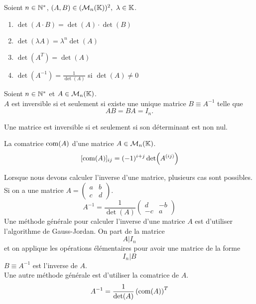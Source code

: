 \begin{proposition}
	Soient $n \in \mathbb{N}^*$, $(A, B) \in (\mathcal{M}_n(\mathbb{K}))^2,\ \lambda \in \mathbb{K}$.
	\begin{multicols}{2}
	    \begin{enumerate}
		\item $\det(A \cdot B) = \det(A) \cdot \det(B)$
		\item $\det(\lambda A) = \lambda^n \det(A)$
		\item $\det(A^T) = \det(A)$
		\item $\det(A^{-1}) = \frac{1}{\det(A)}$ si $\det(A) \neq 0$
	\end{enumerate}
	\end{multicols}
\end{proposition}

\begin{definition}
	Soient $n \in \mathbb{N}^*$ et $A \in \mathcal{M}_n(\mathbb{K})$.
	\\
	$A$ est inversible si et seulement si existe une unique matrice $B \equiv A^{-1}$ telle que 
	\[AB = BA = I_n.\]
\end{definition}

\begin{proposition}
	Une matrice est inversible si et seulement si son déterminant est non nul.
\end{proposition}

\begin{definition}[Comatrice]
	La comatrice $\operatorname{com}(A)$ d'une matrice $A \in \mathcal{M}_n(\mathbb{K})$.
	$$
	[\operatorname{com}(A)]_{ij} = (-1)^{i + j} \det(A^{(ij)}) 
	$$
\end{definition}

\begin{proposition}
    Lorsque nous devons calculer l'inverse d'une matrice, plusieurs cas sont possibles.
    Si on a une matrice
    $A =
    \begin{pmatrix}
        a & b \\
        c & d
    \end{pmatrix}
    $.
    \[
    A^{-1} = \frac{1}{\det(A)} 
    \begin{pmatrix}
        d & -b \\
        -c & a
    \end{pmatrix}
    \]
    Une méthode générale pour calculer l'inverse d'une matrice $A$ est d'utiliser l'algorithme de Gauss-Jordan.
    On part de la matrice 
    \[ A|I_n \]
    et on applique les opérations élémentaires pour avoir une matrice de la forme
    \[I_n|B\]
    $B \equiv A^{-1}$ est l'inverse de $A$.
    \\
    Une autre méthode générale est d'utiliser la comatrice de $A$.
    \[ A^{-1} = \frac{1}{\det(A)} \left( \operatorname{com}(A) \right)^T \]
\end{proposition}

